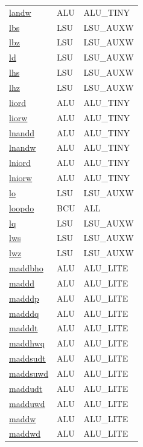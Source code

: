 \begin{small}
\begin{longtable}[l]{l l l}
\hyperlink{lvx.landw}{landw} & ALU & ALU\_TINY \\ 
\hyperlink{lvx.lbs}{lbs} & LSU & LSU\_AUXW \\ 
\hyperlink{lvx.lbz}{lbz} & LSU & LSU\_AUXW \\ 
\hyperlink{lvx.ld}{ld} & LSU & LSU\_AUXW \\ 
\hyperlink{lvx.lhs}{lhs} & LSU & LSU\_AUXW \\ 
\hyperlink{lvx.lhz}{lhz} & LSU & LSU\_AUXW \\ 
\hyperlink{lvx.liord}{liord} & ALU & ALU\_TINY \\ 
\hyperlink{lvx.liorw}{liorw} & ALU & ALU\_TINY \\ 
\hyperlink{lvx.lnandd}{lnandd} & ALU & ALU\_TINY \\ 
\hyperlink{lvx.lnandw}{lnandw} & ALU & ALU\_TINY \\ 
\hyperlink{lvx.lniord}{lniord} & ALU & ALU\_TINY \\ 
\hyperlink{lvx.lniorw}{lniorw} & ALU & ALU\_TINY \\ 
\hyperlink{lvx.lo}{lo} & LSU & LSU\_AUXW \\ 
\hyperlink{lvx.loopdo}{loopdo} & BCU & ALL \\ 
\hyperlink{lvx.lq}{lq} & LSU & LSU\_AUXW \\ 
\hyperlink{lvx.lws}{lws} & LSU & LSU\_AUXW \\ 
\hyperlink{lvx.lwz}{lwz} & LSU & LSU\_AUXW \\ 
\hyperlink{lvx.maddbho}{maddbho} & ALU & ALU\_LITE \\ 
\hyperlink{lvx.maddd}{maddd} & ALU & ALU\_LITE \\ 
\hyperlink{lvx.madddp}{madddp} & ALU & ALU\_LITE \\ 
\hyperlink{lvx.madddq}{madddq} & ALU & ALU\_LITE \\ 
\hyperlink{lvx.madddt}{madddt} & ALU & ALU\_LITE \\ 
\hyperlink{lvx.maddhwq}{maddhwq} & ALU & ALU\_LITE \\ 
\hyperlink{lvx.maddsudt}{maddsudt} & ALU & ALU\_LITE \\ 
\hyperlink{lvx.maddsuwd}{maddsuwd} & ALU & ALU\_LITE \\ 
\hyperlink{lvx.maddudt}{maddudt} & ALU & ALU\_LITE \\ 
\hyperlink{lvx.madduwd}{madduwd} & ALU & ALU\_LITE \\ 
\hyperlink{lvx.maddw}{maddw} & ALU & ALU\_LITE \\ 
\hyperlink{lvx.maddwd}{maddwd} & ALU & ALU\_LITE \\ 

\end{longtable}
\end{small}
